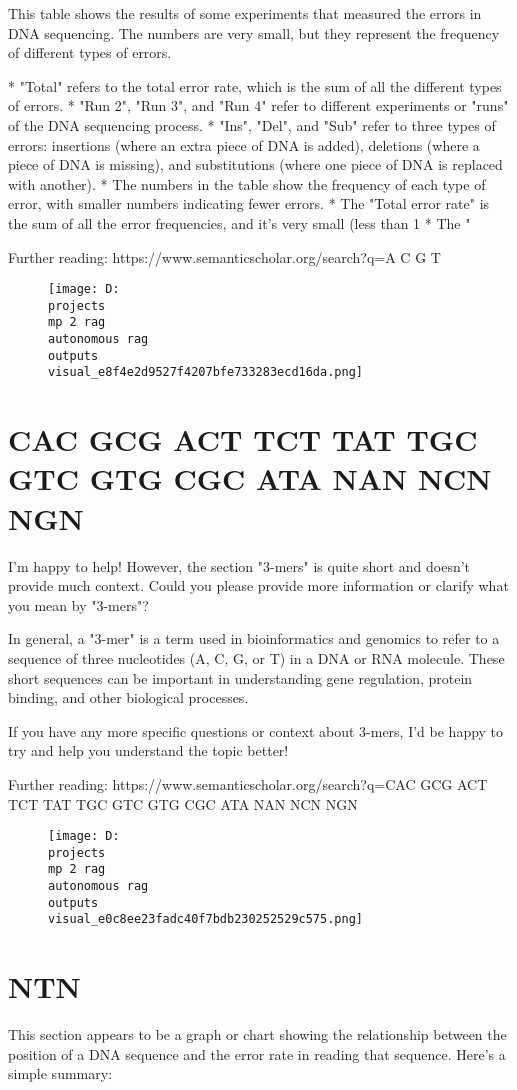 \documentclass[12pt,a4paper]{article}
\begin{document}
This table shows the results of some experiments that measured the errors in DNA sequencing. The numbers are very small, but they represent the frequency of different types of errors.

* "Total" refers to the total error rate, which is the sum of all the different types of errors.
* "Run 2", "Run 3", and "Run 4" refer to different experiments or "runs" of the DNA sequencing process.
* "Ins", "Del", and "Sub" refer to three types of errors: insertions (where an extra piece of DNA is added), deletions (where a piece of DNA is missing), and substitutions (where one piece of DNA is replaced with another).
* The numbers in the table show the frequency of each type of error, with smaller numbers indicating fewer errors.
* The "Total error rate" is the sum of all the error frequencies, and it's very small (less than 1%
* The "%

Further reading: https://www.semanticscholar.org/search?q=A
C
G
T
\begin{figure}[h]
\centering
\texttt{[image: D:\\projects\\mp 2 rag\\autonomous rag\\outputs\\visual\_e8f4e2d9527f4207bfe733283ecd16da.png]}
\end{figure}
\section{CAC
GCG
ACT
TCT
TAT
TGC
GTC
GTG
CGC
ATA
NAN
NCN
NGN}
I'm happy to help! However, the section "3-mers" is quite short and doesn't provide much context. Could you please provide more information or clarify what you mean by "3-mers"?

In general, a "3-mer" is a term used in bioinformatics and genomics to refer to a sequence of three nucleotides (A, C, G, or T) in a DNA or RNA molecule. These short sequences can be important in understanding gene regulation, protein binding, and other biological processes.

If you have any more specific questions or context about 3-mers, I'd be happy to try and help you understand the topic better!

Further reading: https://www.semanticscholar.org/search?q=CAC
GCG
ACT
TCT
TAT
TGC
GTC
GTG
CGC
ATA
NAN
NCN
NGN
\begin{figure}[h]
\centering
\texttt{[image: D:\\projects\\mp 2 rag\\autonomous rag\\outputs\\visual\_e0c8ee23fadc40f7bdb230252529c575.png]}
\end{figure}
\section{NTN}
This section appears to be a graph or chart showing the relationship between the position of a DNA sequence and the error rate in reading that sequence. Here's a simple summary:
\end{document}
